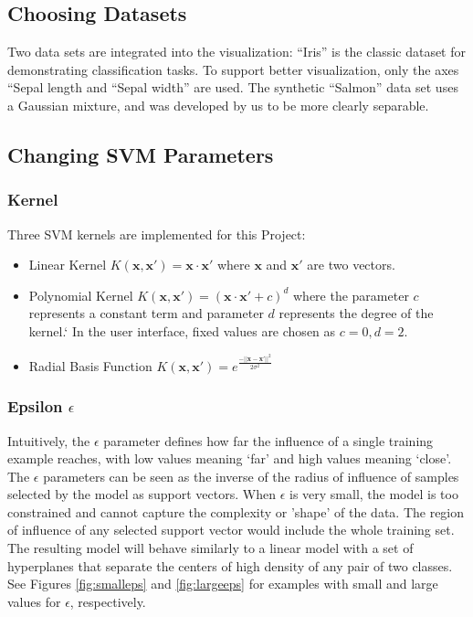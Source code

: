\documentclass[parskip=half]{scrartcl}
\begin{document}
\subsection{Choosing Datasets}

Two data sets are integrated into the visualization:
“Iris” is the classic dataset for demonstrating classification tasks.
To support better visualization,
only the axes “Sepal length and “Sepal width” are used.
The synthetic “Salmon” data set uses a Gaussian mixture,
and was developed by us to be more clearly separable.

\subsection{Changing SVM Parameters}

\subsubsection*{Kernel}
Three SVM kernels are implemented for this Project:
\begin{itemize}
	\item Linear Kernel $K(\mathbf x, \mathbf x') = \mathbf x \cdot \mathbf x'$
    where $\mathbf x$ and $\mathbf x'$ are two vectors.
	\item Polynomial Kernel $K(\mathbf x, \mathbf x') = (\mathbf x \cdot \mathbf x' + c)^d$
    where the parameter $c$ represents a constant term
    and parameter $d$ represents the degree of the kernel.`
    In the user interface, fixed values are chosen as $c=0, d=2$.
	\item Radial Basis Function $
      K(\mathbf x, \mathbf x')
      = e^{\frac{-||\mathbf x- \mathbf x'||^{2}}{2\sigma^2} }
    $
\end{itemize}

\subsubsection*{Epsilon $\epsilon$}
Intuitively, the $\epsilon$ parameter defines how far the influence of a single training example reaches, with low values meaning ‘far’ and high values meaning ‘close’. The $\epsilon$ parameters can be seen as the inverse of the radius of influence of samples selected by the model as support vectors. When $\epsilon$ is very small, the model is too constrained and cannot capture the complexity or 'shape' of the data. The region of influence of any selected support vector would include the whole training set. The resulting model will behave similarly to a linear model with a set of hyperplanes that separate the centers of high density of any pair of two classes.
See Figures \ref{fig:smalleps} and \ref{fig:largeeps}
for examples with small and large values for $\epsilon$, respectively.
\end{document}
